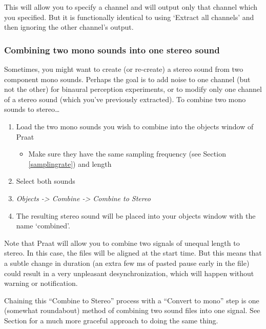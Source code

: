This will allow you to specify a channel and will output only that
channel which you specified. But it is functionally identical to using
`Extract all channels' and then ignoring the other channel's output.

\hypertarget{combining-two-mono-sounds-into-one-stereo-sound}{%
\subsubsection{Combining two mono sounds into one stereo
sound}\label{combining-two-mono-sounds-into-one-stereo-sound}}

Sometimes, you might want to create (or re-create) a stereo sound from
two component mono sounds. Perhaps the goal is to add noise to one
channel (but not the other) for binaural perception experiments, or to
modify only one channel of a stereo sound (which you've previously
extracted). To combine two mono sounds to stereo\ldots{}

\begin{enumerate}
\def\labelenumi{\arabic{enumi}.}
\tightlist
\item
  Load the two mono sounds you wish to combine into the objects window
  of Praat

  \begin{itemize}
  \tightlist
  \item
    Make sure they have the same sampling frequency (see Section
    \ref{samplingrate}) and length
  \end{itemize}
\item
  Select both sounds
\item
  \emph{Objects -\textgreater{} Combine -\textgreater{} Combine to
  Stereo}
\item
  The resulting stereo sound will be placed into your objects window
  with the name `combined'.
\end{enumerate}

Note that Praat will allow you to combine two signals of unequal length
to stereo. In this case, the files will be aligned at the start time.
But this means that a subtle change in duration (an extra few ms of
pasted pause early in the file) could result in a very unpleasant
desynchronization, which will happen without warning or notification.

Chaining this ``Combine to Stereo'' process with a ``Convert to mono''
step is one (somewhat roundabout) method of combining two sound files
into one signal. See Section \label{sub:formulas} for a much more
graceful approach to doing the same thing.

